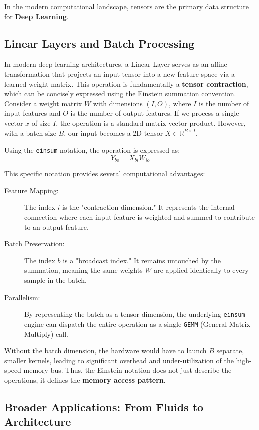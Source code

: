 \documentclass[binding=0.6cm]{sapthesis}
\begin{document}
In the modern computational landscape, tensors are the primary data structure for \textbf{Deep Learning}.

\subsection{Linear Layers and Batch Processing}

In modern deep learning architectures, a Linear Layer serves as an affine transformation that projects an input tensor into a new feature space via a learned weight matrix.
This operation is fundamentally a \textbf{tensor contraction}, which can be concisely expressed using the Einstein summation convention.
Consider a weight matrix $W$ with dimensions $(I, O)$, where $I$ is the number of input features and $O$ is the number of output features.
If we process a single vector $x$ of size $I$, the operation is a standard matrix-vector product. However, with a batch size $B$,
our input becomes a 2D tensor $X \in \mathbb{R}^{B \times I}$.

Using the \texttt{einsum} notation, the operation is expressed as:
\begin{equation}
	Y_{bo} = X_{bi} W_{io}
\end{equation}

This specific notation provides several computational advantages:
\begin{description}
	\item [Feature Mapping:] The index $i$ is the "contraction dimension." It represents the internal connection where each input feature is weighted and summed to contribute to an output feature.
	\item [Batch Preservation:] The index $b$ is a "broadcast index." It remains untouched by the summation, meaning the same weights $W$ are applied identically to every sample in the batch.
	\item [Parallelism:] By representing the batch as a tensor dimension, the underlying \texttt{einsum} engine can dispatch the entire operation as a single \texttt{GEMM} (General Matrix Multiply) call.
\end{description}

Without the batch dimension, the hardware would have to launch $B$ separate, smaller kernels, leading to significant overhead and under-utilization of the high-speed memory bus.
Thus, the Einstein notation does not just describe the operations, it defines the \textbf{memory access pattern}.

\subsection{Broader Applications: From Fluids to Architecture}
\end{document}
